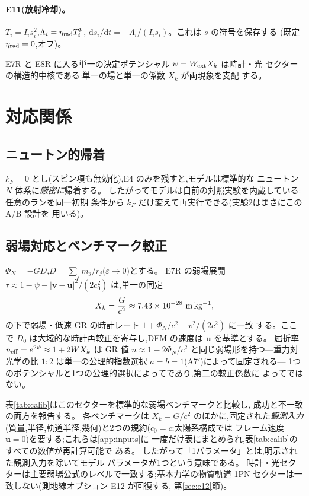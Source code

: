 \documentclass[a4paper,10pt,twocolumn]{ltjsarticle}
\newcommand{\ud}{\mathrm{d}}
\newcommand{\vect}[1]{\bm{#1}}
\newcommand{\Kt}{X_k}
\newcommand{\Dz}{D_0}
\begin{document}
\paragraph*{E11(放射冷却)。}
$T_i = I_i s_i^2$,$\Lambda_i = \eta_{\rm rad}T_i^p$,
$\ud s_i/\ud t = -\Lambda_i/(I_i s_i)$。これは $s$ の符号を保存する
(既定 $\eta_{\rm rad} = 0$,オフ)。

E7R と E8R に入る単一の決定ポテンシャル $\psi = W_{\rm ext}\Kt$ は時計・光
セクターの構造的中核である:単一の場と単一の係数 $\Kt$ が両現象を支配
する。

\section{対応関係}
\label{sec:corr}

\subsection{ニュートン的帰着}
\label{sec:newton}

$k_F = 0$ とし(スピン項も無効化),E4 のみを残すと,モデルは標準的な
ニュートン $N$ 体系に\emph{厳密に}帰着する。
したがってモデルは自前の対照実験を内蔵している:任意のランを同一初期
条件から $k_F$ だけ変えて再実行できる(実験2はまさにこの A/B 設計を
用いる)。

\subsection{弱場対応とベンチマーク較正}
\label{sec:calib}

$\Phi_N = -G D$,$D = \sum_j m_j/r_j$($\varepsilon\to0$)とする。
E7R の弱場展開
$\dot\tau \approx 1 - \psi - |\vect{v}-\vect{u}|^2/(2c_0^2)$
は,単一の同定
\begin{equation}
\Kt = \frac{G}{c^2} \approx 7.43\times10^{-28}\ {\rm m\,kg^{-1}},
\label{eq:kappa}
\end{equation}
の下で弱場・低速 GR の時計レート $1 + \Phi_N/c^2 - v^2/(2c^2)$ に一致
する。ここで $\Dz$ は大域的な時計再較正を寄与し,DFM の速度は
$\vect{u}$ を基準とする。
屈折率 $n_{\rm eff} = e^{2\psi} \approx 1 + 2W\Kt$ は GR 値
$n \approx 1 - 2\Phi_N/c^2$ と同じ弱場形を持つ---重力対光学の比
$1{:}2$ は単一の公理的指数選択 $a = b = 1$(A7$'$)によって固定される---
1つのポテンシャルと1つの公理的選択によってであり,第二の較正係数に
よってではない。

表\ref{tab:calib}はこのセクターを標準的な弱場ベンチマークと比較し,
成功と不一致の両方を報告する。
各ベンチマークは $\Kt = G/c^2$ のほかに,固定された\emph{観測入力}
(質量,半径,軌道半径,幾何)と2つの規約($c_0 = c$;太陽系構成では
フレーム速度 $\vect{u} = 0$)を要する;これらは\ref{app:inputs}に
一度だけ表にまとめられ,表\ref{tab:calib}のすべての数値が再計算可能で
ある。
したがって「1パラメータ」とは,明示された観測入力を除いてモデル
パラメータが1つという意味である。
時計・光セクターは主要弱場公式のレベルで一致する;基本力学の物質軌道
1PN セクターは一致しない(測地線オプション E12 が回復する,
第\ref{sec:e12}節)。
\end{document}
